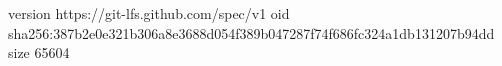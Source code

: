 version https://git-lfs.github.com/spec/v1
oid sha256:387b2e0e321b306a8e3688d054f389b047287f74f686fc324a1db131207b94dd
size 65604
